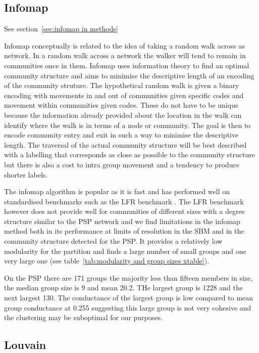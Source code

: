 \subsection{Infomap}
See section~\ref{sec:infomap in methods}

Infomap conceptually is related to the idea of taking a random walk across as network. \cite{rosvall2008maps}In a random walk across a network the walker will tend to remain in communities once in them. Infomap uses information theory to find an optimal community structure and aims to minimise the descriptive length of an encoding of the community struture. The hypothetical random walk is given a binary encoding with movements in and out of communities given specific codes and movement within communities given codes. These do not have to be unique because the information already provided about the location in the walk can identify where the walk is in terms of a node or community. The goal is then to encode community entry and exit in such a way to minimise the descriptive length. The traversal of the actual community structure will be best described with a labelling that corresponds as close as possible to the community structure but there is also a cost to intra group movement and a tendency to produce shorter labels. 

The infomap algorithm is popular as it is fast and has performed well on standardised benchmarks such as the LFR benchmark .\cite{lancichinetti2008benchmark} \cite{newman2018networks} The LFR benchmark however does not provide well for communities of different sizes with a degree structure similar to the PSP network and we find limitations in the infomap method both in its performance at limits of resolution in the SBM and in the community structure detected for the PSP. It provides a relatively low modularity for the partition and finds a large number of small groups and one very large one (see table~\ref{tab:modularity and group sizes xtable}). 

On the PSP there are 171 groups the majority less than fifteen members in size, the median group size is 9 and mean 20.2. THe largest group is 1228 and the next largest 130. The conductance of the largest group is low compared to mean group conductance at 0.255 suggesting this large group is not very cohesive and the clustering may be suboptimal for our purposes. 




\subsection{Louvain}

